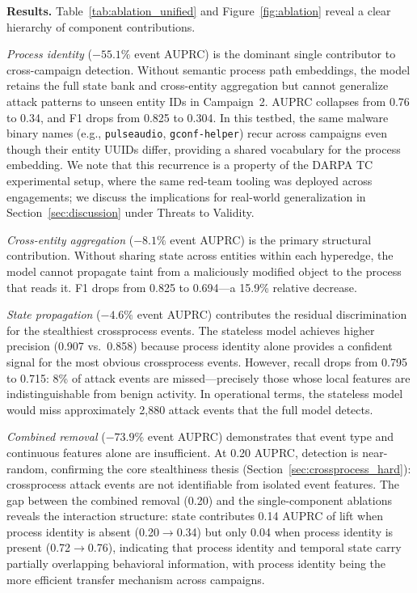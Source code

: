 \documentclass[letterpaper,twocolumn,10pt]{article}
\begin{document}
\textbf{Results.} Table~\ref{tab:ablation_unified} and Figure~\ref{fig:ablation} reveal a clear hierarchy of component contributions.

\emph{Process identity} ($-55.1\%$ event AUPRC) is the dominant single contributor to cross-campaign detection. Without semantic process path embeddings, the model retains the full state bank and cross-entity aggregation but cannot generalize attack patterns to unseen entity IDs in Campaign~2. AUPRC collapses from 0.76 to 0.34, and F1 drops from 0.825 to 0.304. In this testbed, the same malware binary names (e.g., \texttt{pulseaudio}, \texttt{gconf-helper}) recur across campaigns even though their entity UUIDs differ, providing a shared vocabulary for the process embedding. We note that this recurrence is a property of the DARPA TC experimental setup, where the same red-team tooling was deployed across engagements; we discuss the implications for real-world generalization in Section~\ref{sec:discussion} under Threats to Validity.

\emph{Cross-entity aggregation} ($-8.1\%$ event AUPRC) is the primary structural contribution. Without sharing state across entities within each hyperedge, the model cannot propagate taint from a maliciously modified object to the process that reads it. F1 drops from 0.825 to 0.694---a 15.9\% relative decrease.

\emph{State propagation} ($-4.6\%$ event AUPRC) contributes the residual discrimination for the stealthiest crossprocess events. The stateless model achieves higher precision (0.907 vs.\ 0.858) because process identity alone provides a confident signal for the most obvious crossprocess events. However, recall drops from 0.795 to 0.715: 8\% of attack events are missed---precisely those whose local features are indistinguishable from benign activity. In operational terms, the stateless model would miss approximately 2,880 attack events that the full model detects.

\emph{Combined removal} ($-73.9\%$ event AUPRC) demonstrates that event type and continuous features alone are insufficient. At 0.20 AUPRC, detection is near-random, confirming the core stealthiness thesis (Section~\ref{sec:crossprocess_hard}): crossprocess attack events are not identifiable from isolated event features. The gap between the combined removal (0.20) and the single-component ablations reveals the interaction structure: state contributes 0.14 AUPRC of lift when process identity is absent (0.20$\to$0.34) but only 0.04 when process identity is present (0.72$\to$0.76), indicating that process identity and temporal state carry partially overlapping behavioral information, with process identity being the more efficient transfer mechanism across campaigns.
\end{document}
